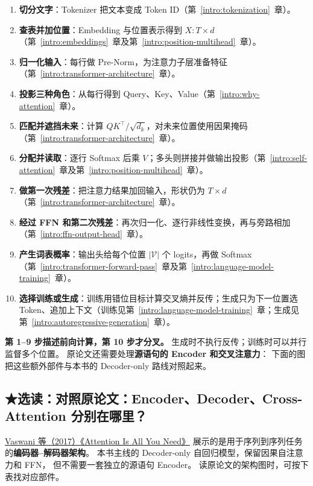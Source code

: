 \begin{enumerate}[leftmargin=2.3em,itemsep=2pt]
\item \textbf{切分文字}：Tokenizer 把文本变成 Token ID（第~\ref*{intro:tokenization}~章）。
\item \textbf{查表并加位置}：Embedding 与位置表示得到 $X:T\times d$（第~\ref*{intro:embeddings}~章及第~\ref*{intro:position-multihead}~章）。
\item \textbf{归一化输入}：每行做 Pre-Norm，为注意力子层准备特征（第~\ref*{intro:transformer-architecture}~章）。
\item \textbf{投影三种角色}：从每行得到 Query、Key、Value（第~\ref*{intro:why-attention}~章）。
\item \textbf{匹配并遮挡未来}：计算 $QK^\top/\sqrt{d_k}$，对未来位置使用因果掩码（第~\ref*{intro:transformer-architecture}~章）。
\item \textbf{分配并读取}：逐行 Softmax 后乘 $V$；多头则拼接并做输出投影（第~\ref*{intro:self-attention}~章及第~\ref*{intro:position-multihead}~章）。
\item \textbf{做第一次残差}：把注意力结果加回输入，形状仍为 $T\times d$（第~\ref*{intro:transformer-architecture}~章）。
\item \textbf{经过 FFN 和第二次残差}：再次归一化、逐行非线性变换，再与旁路相加（第~\ref*{intro:ffn-output-head}~章）。
\item \textbf{产生词表概率}：输出头给每个位置 $|\mathcal V|$ 个 logits，再做 Softmax（第~\ref*{intro:transformer-forward-pass}~章及第~\ref*{intro:language-model-training}~章）。
\item \textbf{选择训练或生成}：训练用错位目标计算交叉熵并反传；生成只为下一位置选 Token、追加上下文（训练见第~\ref*{intro:language-model-training}~章；生成见第~\ref*{intro:autoregressive-generation}~章）。
\end{enumerate}

\textbf{第 1--9 步描述前向计算，第 10 步才分叉。}
生成时不执行反传；训练时可以并行监督多个位置。
原论文还需要处理\textbf{源语句的 Encoder 和交叉注意力}：
下面的图把这些额外部件与本书的 Decoder-only 路线对照起来。


\subsection{\texorpdfstring{{\symboliconfont ★}}{★}选读：对照原论文：Encoder、Decoder、Cross-Attention 分别在哪里？}
\label{elective:original-paper}

\href{https://arxiv.org/abs/1706.03762}{Vaswani 等（2017）《Attention Is All You Need》}
展示的是用于序列到序列任务的\textbf{编码器--解码器架构}。
本书主线的 Decoder-only 自回归模型，保留因果自注意力和 FFN，
但不需要一套独立的源语句 Encoder。
读原论文的架构图时，可按下表找对应部件。

